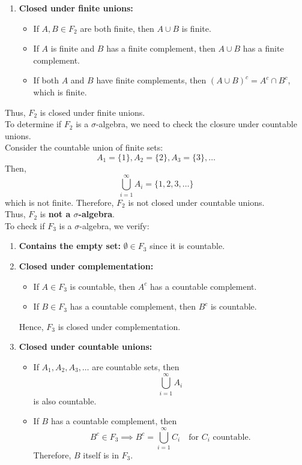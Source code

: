 \begin{example}
\begin{enumerate}
    \item \textbf{Closed under finite unions:}
    \begin{itemize}
        \item If \(A, B \in F_2\) are both finite, then \(A \cup B\) is finite.
        \item If \(A\) is finite and \(B\) has a finite complement, then \(A \cup B\) has a finite complement.
        \item If both \(A\) and \(B\) have finite complements, then \((A \cup B)^c = A^c \cap B^c\), which is finite.
    \end{itemize}
\end{enumerate}

Thus, \(F_2\) is closed under finite unions.\\

To determine if \(F_2\) is a \(\sigma\)-algebra, we need to check the closure under countable unions.\\

Consider the countable union of finite sets:
\[
A_1 = \{1\}, A_2 = \{2\}, A_3 = \{3\}, \ldots
\]
Then,
\[
\bigcup_{i=1}^{\infty} A_i = \{1, 2, 3, \ldots\}
\]
which is not finite. Therefore, \(F_2\) is not closed under countable unions.\\

Thus, \(F_2\) is \textbf{not a \(\sigma\)-algebra}.\\

To check if \(F_3\) is a \(\sigma\)-algebra, we verify:

\begin{enumerate}
    \item \textbf{Contains the empty set:} \(\emptyset \in F_3\) since it is countable.

    \item \textbf{Closed under complementation:}
    \begin{itemize}
        \item If \(A \in F_3\) is countable, then \(A^c\) has a countable complement.
        \item If \(B \in F_3\) has a countable complement, then \(B^c\) is countable.
    \end{itemize}
    Hence, \(F_3\) is closed under complementation.

    \item \textbf{Closed under countable unions:}
    \begin{itemize}
        \item If \(A_1, A_2, A_3, \ldots\) are countable sets, then
        \[
        \bigcup_{i=1}^{\infty} A_i
        \]
        is also countable.
        \item If \(B\) has a countable complement, then
        \[
        B^c \in F_3 \implies B^c = \bigcup_{i=1}^{\infty} C_i \quad \text{for } C_i \text{ countable}.
        \]
        Therefore, \(B\) itself is in \(F_3\).
    \end{itemize}
\end{enumerate}


\end{example}
